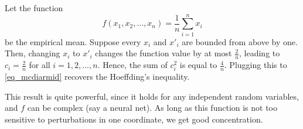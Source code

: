 \begin{remark}
Let the function \[ f(x_1, x_2, \dots, x_n) = \frac 1 n \sum_{i=1}^n x_i \] be the empirical mean.
Suppose every $x_i$ and $x'_i$ are bounded from above by one.
Then, changing $x_i$ to $x'_i$ changes the function value by at most $\frac 2 n$, leading to $c_i = \frac 2 n$ for all $i = 1, 2, \dots, n$.
Hence, the sum of $c_i^2$ is equal to $\frac 4 {n}$.
Plugging this to \eqref{eq_mcdiarmid} recovers the Hoeffding's inequality.

This result is quite powerful, since it holds for any independent random variables, and $f$ can be complex (say a neural net).
As long as this function is not too sensitive to perturbations in one coordinate, we get good concentration.
\end{remark}

